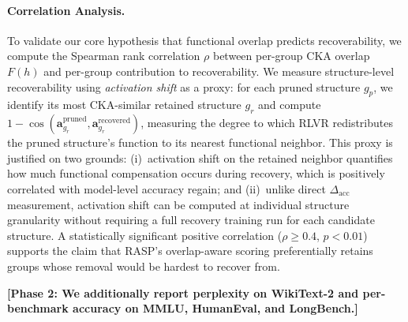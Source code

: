 \paragraph{Correlation Analysis.}
To validate our core hypothesis that functional overlap predicts recoverability, we compute the Spearman rank correlation $\rho$ between per-group CKA overlap $F(h)$ and per-group contribution to recoverability.
We measure structure-level recoverability using \emph{activation shift} as a proxy: for each pruned structure $g_p$, we identify its most CKA-similar retained structure $g_r$ and compute $1 - \cos(\mathbf{a}^{\text{pruned}}_{g_r}, \mathbf{a}^{\text{recovered}}_{g_r})$, measuring the degree to which RLVR redistributes the pruned structure's function to its nearest functional neighbor.
This proxy is justified on two grounds: (i)~activation shift on the retained neighbor quantifies how much functional compensation occurs during recovery, which is positively correlated with model-level accuracy regain; and (ii)~unlike direct $\Delta_{\text{acc}}$ measurement, activation shift can be computed at individual structure granularity without requiring a full recovery training run for each candidate structure.
A statistically significant positive correlation ($\rho \geq 0.4$, $p < 0.01$) supports the claim that RASP's overlap-aware scoring preferentially retains groups whose removal would be hardest to recover from.

\textbf{[Phase 2: We additionally report perplexity on WikiText-2 and per-benchmark accuracy on MMLU, HumanEval, and LongBench.]}
